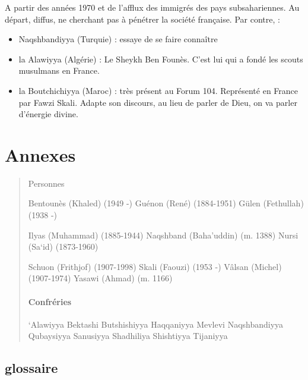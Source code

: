 A partir des années 1970 et de l'afflux des immigrés des pays subsahariennes. Au départ, diffus, ne cherchant pas à pénétrer la société française.
Par contre, :
\begin{itemize}
    \item Naqshbandiyya (Turquie) : essaye de se faire connaître
    \item la Alawiyya (Algérie) : Le Sheykh Ben Founès. C'est lui qui a fondé les scouts musulmans en France. 
    \item la Boutchichiyya (Maroc) : très présent au Forum 104. Représenté en France par Fawzi Skali. Adapte son discours, au lieu de parler de Dieu, on va parler d'énergie divine.
\end{itemize}




 
\section{Annexes}
\begin{quote}
{Personnes}

Bentounès (Khaled) (1949 -) Guénon (René) (1884-1951) Gülen (Fethullah)
(1938 -)

Ilyas (Muhammad) (1885-1944) Naqshband (Baha'uddin) (m. 1388) Nursi
(Sa`id) (1873-1960)

Schuon (Frithjof) (1907-1998) Skali (Faouzi) (1953 -) Vâlsan (Michel)
(1907-1974) Yasawi (Ahmad) (m. 1166)

\paragraph{Confréries} `Alawiyya Bektashi Butshishiyya Haqqaniyya
Mevlevi Naqshbandiyya Qubaysiyya Sanusiyya Shadhiliya Shishtiyya
Tijaniyya
\end{quote}
\subsection{glossaire}

